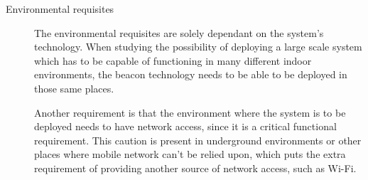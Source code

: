\begin{description}
\item [Environmental requisites] The environmental requisites are solely dependant on the system's technology. When studying the possibility of deploying a large scale system which has to be capable of functioning in many different indoor environments, the beacon technology needs to be able to be deployed in those same places.

Another requirement is that the environment where the system is to be deployed needs to have network access, since it is a critical functional requirement. This caution is present in underground environments or other places where mobile network can't be relied upon, which puts the extra requirement of providing another source of network access, such as Wi-Fi.
\end{description}

























